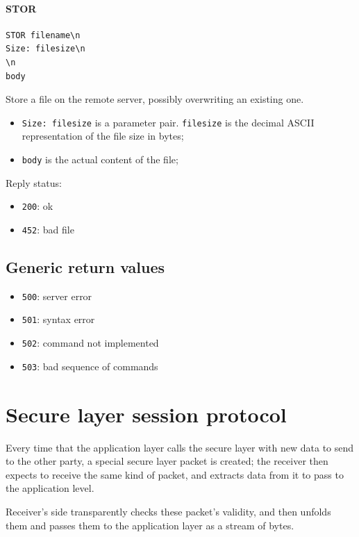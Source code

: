 \documentclass[a4paper,12pt]{article}
\begin{document}
\paragraph{STOR}
\begin{verbatim}
STOR filename\n
Size: filesize\n
\n
body
\end{verbatim}

Store a file on the remote server, possibly overwriting an existing one.

\begin{itemize}
  \item \texttt{Size: filesize} is a parameter pair. \texttt{filesize} is the decimal ASCII representation of the file size in bytes;
  \item \texttt{body} is the actual content of the file;
\end{itemize}

Reply status:
\begin{itemize}
  \item \texttt{200}: ok
  \item \texttt{452}: bad file
\end{itemize}

\subsection{Generic return values}
\begin{itemize}
  \item \texttt{500}: server error
  \item \texttt{501}: syntax error
  \item \texttt{502}: command not implemented
  \item \texttt{503}: bad sequence of commands
\end{itemize}

\section{Secure layer session protocol}
Every time that the application layer calls the secure layer with new data to send to the other party, a special secure layer packet is created; the receiver then expects to receive the same kind of packet, and extracts data from it to pass to the application level.

Receiver's side transparently checks these packet's validity, and then unfolds them and passes them to the application layer as a stream of bytes.
\end{document}
